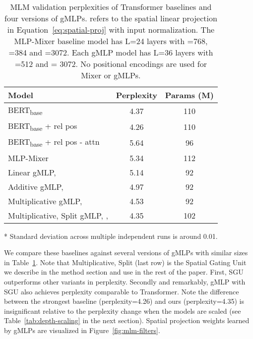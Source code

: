 \documentclass{article}
\newcommand{\gffn}{gMLP\xspace}
\begin{document}
\begin{table}[h]
\centering\small
\caption{MLM validation perplexities of Transformer baselines and four versions of \gffn{s}.  refers to the spatial linear projection in Equation~\eqref{eq:spatial-proj} with input normalization.
The MLP-Mixer baseline model has L=24 layers with =768, =384 and =3072.
Each \gffn model has L=36 layers with =512 and  = 3072. No positional encodings are used for Mixer or \gffn{s}.}
\begin{threeparttable}
\begin{tabular}{@{}l|c|c@{}}
\toprule
Model & Perplexity & Params (M) \\ \midrule
BERT\textsubscript{base} &  4.37 &  110 \\
BERT\textsubscript{base} + rel pos & 4.26 & 110 \\ 
BERT\textsubscript{base} + rel pos - attn & 5.64 & 96 \\ \midrule
MLP-Mixer & 5.34 & 112 \\
\midrule
Linear \gffn,  & 5.14 & 92 \\
Additive \gffn,  & 4.97 & 92 \\
Multiplicative \gffn,   & 4.53 & 92 \\ 
Multiplicative, Split \gffn, ,   & 4.35 & 102 \\

\bottomrule
\end{tabular}
\begin{tablenotes}
  \small
  \item[*] Standard deviation across multiple independent runs is around 0.01.
\end{tablenotes}
\end{threeparttable}
\vspace{-0.525cm}
\label{tab:baselines}
\end{table}

We compare these baselines against several versions of \gffn{s} with similar sizes in Table~\ref{tab:baselines}. Note that Multiplicative, Split (last row) is the Spatial Gating Unit we describe in the method section and use in the rest of the paper. First, SGU outperforms other variants in perplexity. Secondly and remarkably, \gffn with SGU also achieves perplexity comparable to Transformer.
Note the difference between the strongest baseline (perplexity=4.26) and ours (perplexity=4.35) is insignificant relative to the perplexity change when the models are scaled (see Table~\ref{tab:depth-scaling} in the next section).
Spatial projection weights
learned by \gffn{s} are visualized in Figure~\ref{fig:mlm-filters}.
\end{document}
